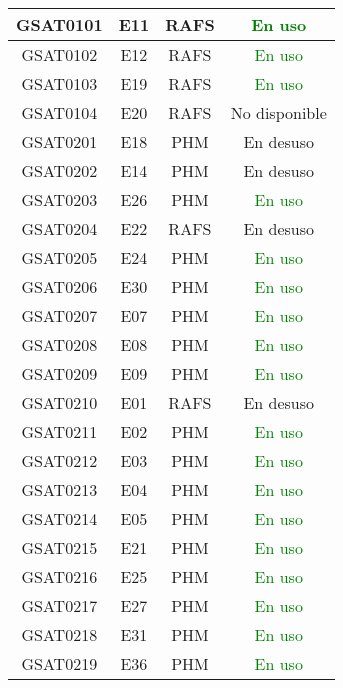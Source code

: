 \begin{center}
\begin{longtable}{|c|c|c|c|}
        GSAT0101 & E11 & RAFS & \textcolor{green}{En uso} \\
        \hline
        GSAT0102 & E12 & RAFS & \textcolor{green}{En uso} \\
        \hline
        GSAT0103 & E19 & RAFS & \textcolor{green}{En uso} \\
        \hline
        GSAT0104 & E20 & RAFS & \textcolor{burgundy}{No disponible} \\
        \hline
        GSAT0201 & E18 & PHM & \textcolor{burgundy}{En desuso} \\
        \hline
        GSAT0202 & E14 & PHM & \textcolor{burgundy}{En desuso} \\
        \hline
        GSAT0203 & E26 & PHM & \textcolor{green}{En uso} \\
        \hline
        GSAT0204 & E22 & RAFS & \textcolor{burgundy}{En desuso} \\
        \hline
        GSAT0205 & E24 & PHM & \textcolor{green}{En uso} \\
        \hline
        GSAT0206 & E30 & PHM & \textcolor{green}{En uso} \\
        \hline
        GSAT0207 & E07 & PHM & \textcolor{green}{En uso} \\
        \hline
        GSAT0208 & E08 & PHM & \textcolor{green}{En uso} \\
        \hline
        GSAT0209 & E09 & PHM & \textcolor{green}{En uso} \\
        \hline
        GSAT0210 & E01 & RAFS & \textcolor{burgundy}{En desuso} \\
        \hline
        GSAT0211 & E02 & PHM & \textcolor{green}{En uso} \\
        \hline
        GSAT0212 & E03 & PHM & \textcolor{green}{En uso} \\
        \hline
        GSAT0213 & E04 & PHM & \textcolor{green}{En uso} \\
        \hline
        GSAT0214 & E05 & PHM & \textcolor{green}{En uso} \\
        \hline
        GSAT0215 & E21 & PHM & \textcolor{green}{En uso} \\
        \hline
        GSAT0216 & E25 & PHM & \textcolor{green}{En uso} \\
        \hline
        GSAT0217 & E27 & PHM & \textcolor{green}{En uso} \\
        \hline
        GSAT0218 & E31 & PHM & \textcolor{green}{En uso} \\
        \hline
        GSAT0219 & E36 & PHM & \textcolor{green}{En uso} \\

\end{longtable}
\end{center}
